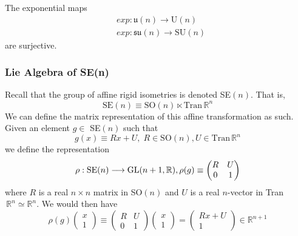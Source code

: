     \begin{theorem}
    The exponential maps 
    \begin{align*}
      & exp: \mathfrak{u}(n) \longrightarrow \text{U}(n) \\
      & exp: \mathfrak{su}(n) \longrightarrow \text{SU}(n)
    \end{align*}
    are surjective. 
    \end{theorem}

  \subsubsection{Lie Algebra of SE(n)}

    Recall that the group of affine rigid isometries is denoted SE$(n)$. That is, 
    \begin{equation}
      \text{SE}(n) \equiv \text{SO}(n) \ltimes \text{Tran}\,\mathbb{R}^n
    \end{equation}
    We can define the matrix representation of this affine transformation as such. Given an element $g \in$ SE$(n)$ such that
    \begin{equation}
      g(x) \equiv R x + U, \; R \in \text{SO}(n), U \in \text{Tran}\, \mathbb{R}^n 
    \end{equation}
    we define the representation
    \begin{equation}
      \rho: \text{SE}(n) \longrightarrow \operatorname{GL}(n+1, \mathbb{R}), \rho(g) \equiv \begin{pmatrix}
      R&U\\0&1
      \end{pmatrix}
    \end{equation}
    where $R$ is a real $n\times n$ matrix in SO$(n)$ and $U$ is a real $n$-vector in Tran$\,\mathbb{R}^n \simeq \mathbb{R}^n$. We would then have
    \begin{equation}
      \rho(g) \begin{pmatrix}
      x\\1
      \end{pmatrix} \equiv \begin{pmatrix}
      R&U\\0&1
      \end{pmatrix} \begin{pmatrix}
      x\\1
      \end{pmatrix} = \begin{pmatrix}
      R x + U\\1
      \end{pmatrix} \in \mathbb{R}^{n+1}
    \end{equation}

